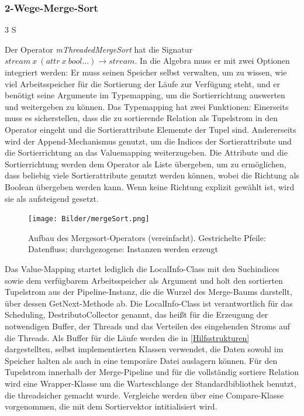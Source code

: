\documentclass[a4paper,12pt,twoside]{article}
\newcommand{\Fb}[1]{\textit{#1}} %
\begin{document}
\subsubsection{2-Wege-Merge-Sort} 3 S

Der Operator \Fb{mThreadedMergeSort} hat die Signatur $stream~x~(attr~x~bool \ldots) \longrightarrow stream$. In die Algebra muss er mit zwei Optionen integriert werden: Er muss seinen Speicher selbst verwalten, um zu wissen, wie viel Arbeitsspeicher für die Sortierung der Läufe zur Verfügung steht, und er benötigt seine Argumente im Typemapping, um die Sortierrichtung auswerten und weitergeben zu können. Das Typemapping hat zwei Funktionen: Einerseits muss es sicherstellen, dass die zu sortierende Relation als Tupelstrom in den Operator eingeht und die Sortierattribute Elememte der Tupel sind. Andererseits wird der Append-Mechanismus genutzt, um die Indices der Sortierattribute und die Sortierrichtung an das Valuemapping weiterzugeben. Die Attribute und die Sortierrichtung werden dem Operator als Liste übergeben, um zu ermöglichen, dass beliebig viele Sortierattribute genutzt werden können, wobei die Richtung als Boolean übergeben werden kann. Wenn keine Richtung explizit gewählt ist, wird sie als aufsteigend gesetzt.

\begin{figure}
	\centering
	\texttt{[image: Bilder/mergeSort.png]}
	\caption{Aufbau des Mergesort-Operators (vereinfacht). Gestrichelte Pfeile: Datenfluss; durchgezogene: Instanzen werden erzeugt}
	\label{img:KlassSort}
\end{figure}


Das Value-Mapping startet lediglich die LocalInfo-Class mit den Suchindices sowie dem verfügbarem Arbeitsspeicher als Argument und holt den sortierten Tupelstrom aus der Pipeline-Instanz, die die Wurzel des Merge-Baums darstellt, über dessen GetNext-Methode ab. Die LocalInfo-Class ist verantwortlich für das Scheduling, DestributoCollector genannt, das heißt für die Erzeugung der notwendigen Buffer, der Threads und das Verteilen des eingehenden Stroms auf die Threads. Als Buffer für die Läufe werden die in \autoref{Hilfsstrukturen} dargestellten, selbst implementierten Klassen verwendet, die Daten sowohl im Speicher halten als auch in eine temporäre Datei auslagern können. Für den Tupelstrom innerhalb der Merge-Pipeline und für die vollständig sortiere Relation wird eine Wrapper-Klasse um die Warteschlange der Standardbibliothek benutzt, die threadsicher gemacht wurde. Vergleiche werden über eine Compare-Klasse vorgenommen, die mit dem Sortiervektor intitialisiert wird.
\end{document}
